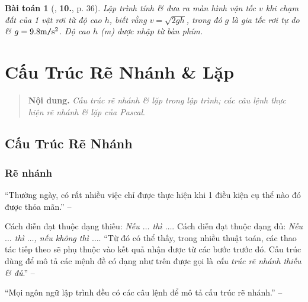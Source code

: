 \documentclass[oneside]{book}
\numberwithin{equation}{section}
\newtheorem{baitoan}{Bài toán}[section]
\begin{document}
\begin{baitoan}[\cite{SGK_Tin_Hoc_11}, \textbf{10.}, p. 36]
	Lập trình tính \& đưa ra màn hình vận tốc $v$ khi chạm đất của 1 vật rơi từ độ cao $h$, biết rằng $v = \sqrt{2gh}$, trong đó $g$ là \emph{gia tốc rơi tự do} \& $g = 9.8{\rm m\texttt{/}s^2}$. Độ cao $h$ (m) được nhập từ bàn phím.
\end{baitoan}


\chapter{Cấu Trúc Rẽ Nhánh \& Lặp}

\begin{quotation}
	\textbf{Nội dung.} \textit{Cấu trúc rẽ nhánh \& lặp trong lập trình; các câu lệnh thực hiện rẽ nhánh \& lặp của Pascal}.
\end{quotation}

\section{Cấu Trúc Rẽ Nhánh}

\subsection{Rẽ nhánh}
``Thường ngày, có rất nhiều việc chỉ được thực hiện khi 1 điều kiện cụ thể nào đó được thỏa mãn.'' -- \cite[p. 38]{SGK_Tin_Hoc_11}

Cách diễn đạt thuộc dạng thiếu: \textit{Nếu $\ldots$ thì $\ldots$}. Cách diễn đạt thuộc dạng đủ: \textit{Nếu $\ldots$ thì $\ldots$, nếu không thì $\ldots$}. ``Từ đó có thể thấy, trong nhiều thuật toán, các thao tác tiếp theo sẽ phụ thuộc vào kết quả nhận được từ các bước trước đó. Cấu trúc dùng để mô tả các mệnh đề có dạng như trên được gọi là \textit{cấu trúc rẽ nhánh thiếu \& đủ}.'' -- \cite[p. 38]{SGK_Tin_Hoc_11}

``Mọi ngôn ngữ lập trình đều có các câu lệnh để mô tả cấu trúc rẽ nhánh.'' -- \cite[p. 39]{SGK_Tin_Hoc_11}
\end{document}
